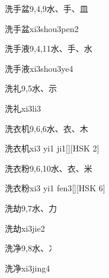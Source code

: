 \begin{Entry}{洗手盆}{9,4,9}{⽔、⼿、⽫}
  \begin{Phonetics}{洗手盆}{xi3shou3pen2}
  \end{Phonetics}
\end{Entry}

\begin{Entry}{洗手液}{9,4,11}{⽔、⼿、⽔}
  \begin{Phonetics}{洗手液}{xi3shou3ye4}
  \end{Phonetics}
\end{Entry}

\begin{Entry}{洗礼}{9,5}{⽔、⽰}
  \begin{Phonetics}{洗礼}{xi3li3}
  \end{Phonetics}
\end{Entry}

\begin{Entry}{洗衣机}{9,6,6}{⽔、⾐、⽊}
  \begin{Phonetics}{洗衣机}{xi3 yi1 ji1}[][HSK 2]
  \end{Phonetics}
\end{Entry}

\begin{Entry}{洗衣粉}{9,6,10}{⽔、⾐、⽶}
  \begin{Phonetics}{洗衣粉}{xi3 yi1 fen3}[][HSK 6]
  \end{Phonetics}
\end{Entry}

\begin{Entry}{洗劫}{9,7}{⽔、⼒}
  \begin{Phonetics}{洗劫}{xi3jie2}
  \end{Phonetics}
\end{Entry}

\begin{Entry}{洗净}{9,8}{⽔、⼎}
  \begin{Phonetics}{洗净}{xi3jing4}
  \end{Phonetics}
\end{Entry}

